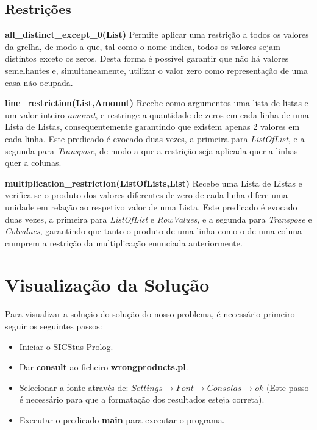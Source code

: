 \documentclass[11pt]{article}
\begin{document}
\subsection{Restrições}

\textbf{ all\_distinct\_except\_0(List)} Permite aplicar uma restrição a todos os valores da grelha, de modo a que, tal como o nome indica, todos os valores sejam distintos exceto os zeros. Desta forma é possível garantir que não há valores semelhantes e, simultaneamente, utilizar o valor zero como representação de uma casa não ocupada.

\bigskip

\textbf{line\_restriction(List,Amount)} Recebe como argumentos uma lista de listas e um valor inteiro \emph{amount}, e restringe a quantidade de zeros em cada linha de uma Lista de Listas, consequentemente garantindo que existem apenas 2 valores em cada linha. Este predicado é evocado duas vezes, a primeira para \emph{ListOfList}, e a segunda para \emph{Transpose}, de modo a que a restrição seja aplicada quer a linhas quer a colunas.

\bigskip

\textbf{multiplication\_restriction(ListOfLists,List)} Recebe uma Lista de Listas e verifica se o produto dos valores diferentes de zero de cada linha difere uma unidade em relação ao respetivo valor de uma Lista. Este predicado é evocado duas vezes, a primeira para \emph{ListOfList} e \emph{RowValues}, e a segunda para \emph{Transpose} e \emph{Colvalues}, garantindo que tanto o produto de uma linha como o de uma coluna cumprem a restrição da multiplicação enunciada anteriormente.

\pagebreak

\section{Visualização da Solução}

Para visualizar a solução do solução do nosso problema, é necessário primeiro seguir os seguintes passos:

\begin{itemize}
	\item Iniciar o SICStus Prolog.
	\item Dar \textbf{consult} ao ficheiro \textbf{wrongproducts.pl}.
	\item Selecionar a fonte através de: \(Settings \to Font \to Consolas \to ok \) (Este passo é necessário para que a formatação dos resultados esteja correta).
	\item Executar o predicado \textbf{main} para executar o programa.
\end{itemize}
\end{document}
